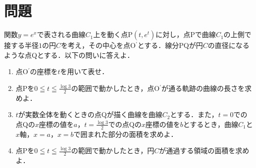 \documentclass[a3paper,twocolumn,fleqn]{ltjsarticle}
\begin{document}
\section{問題}
関数$y=e^x$で表される曲線$C_1$上を動く点P$(t,e^t)$に対し，点Pで曲線$C_1$の上側で接する半径$1$の円$C$を考え，その中心を点O$^\prime$とする．線分PQが円$C$の直径になるような点Qとする．以下の問いに答えよ．
\begin{enumerate}[(1)]
    \item 点O$^\prime$の座標を$t$を用いて表せ．
    \item 点Pを$\displaystyle 0\leqq t\leqq \frac{\log3}{2} $の範囲で動かしたとき，点O$^\prime$が通る軌跡の曲線の長さを求めよ．
    \item $t$が実数全体を動くときの点Qが描く曲線を曲線$C_2$とする．また，$t=0$での点Qの$x$座標の値を$a$，$\displaystyle t=\frac{\log3}{2}$での点Qの$x$座標の値を$b$とするとき，曲線$C_1$と$x$軸，$x=a$，$x=b$で囲まれた部分の面積を求めよ．
    \item 点Pを$\displaystyle 0\leqq t\leqq \frac{\log3}{2} $の範囲で動かしたとき，円$C$が通過する領域の面積を求めよ．
\end{enumerate}
\end{document}
